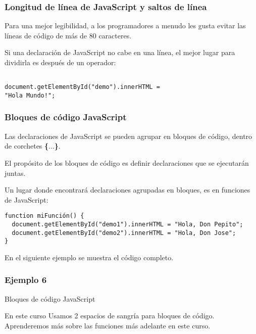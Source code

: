 \begin{frame}[fragile]
  \frametitle{Longitud de línea de JavaScript y saltos de línea}

  Para una mejor legibilidad, a los programadores a menudo
  les gusta evitar las líneas de código de más de 80 caracteres.

  \vspace{\baselineskip}
  Si una declaración de JavaScript no cabe en una línea,
  el mejor lugar para dividirla es después de un operador: 

  \vspace{\baselineskip}
  \begin{lstlisting}

document.getElementById("demo").innerHTML =
"Hola Mundo!"; 

  \end{lstlisting}
\end{frame}

\begin{frame}[fragile]
  \frametitle{Bloques de código JavaScript}

  Las declaraciones de JavaScript se pueden agrupar
  en bloques de código, dentro de corchetes \textbf{\{}...\textbf{\}}.

  \vspace{\baselineskip}
  El propósito de los bloques de código es definir declaraciones
  que se ejecutarán juntas.

  \vspace{\baselineskip}
  Un lugar donde encontrará declaraciones agrupadas en bloques,
  es en funciones de JavaScript: 

  \vspace{\baselineskip}
  \begin{lstlisting}
function miFunción() {
  document.getElementById("demo1").innerHTML = "Hola, Don Pepito";
  document.getElementById("demo2").innerHTML = "Hola, Don Jose";
}
  \end{lstlisting}

  \vspace{\baselineskip}
  En el siguiente ejemplo se muestra el código completo.
\end{frame}

\begin{frame}[fragile]
  \frametitle{Ejemplo 6}
  
\end{frame}

\begin{frame}[c]{Bloques de código JavaScript}

  \begin{block}{En este curso}
    Usamos 2 espacios de sangría para bloques de código.
    Aprenderemos más sobre las funciones más adelante en este curso. 
  \end{block}
\end{frame}

